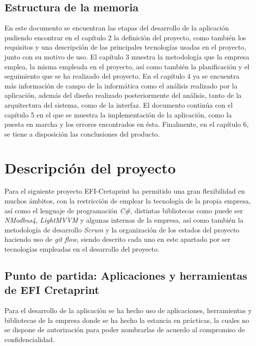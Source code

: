 \documentclass[pdftex,11pt,a4paper]{book}
\begin{document}
\section{Estructura de la memoria}

En este documento se encuentran las etapas del desarrollo de la aplicación pudiendo encontrar en el capítulo 2 la definición del proyecto, como también los requisitos y una descripción de las principales tecnologías usadas en el proyecto, junto con su motivo de uso. El capítulo 3 muestra la metodología que la empresa emplea, la misma empleada en el proyecto, así como también la planificación y el seguimiento que se ha realizado del proyecto. En el capítulo 4 ya se encuentra más información de campo de la informática como el análisis realizado por la aplicación, además del diseño realizado posteriormente del análisis, tanto de la arquitectura del sistema, como de la interfaz. El documento continúa con el capítulo 5 en el que se muestra la implementación de la aplicación, como la puesta en marcha y los errores encontrados en ésta. Finalmente, en el capítulo 6, se tiene a disposición las conclusiones del producto.

\chapter{Descripción del proyecto}


Para el siguiente proyecto EFI-Cretaprint ha permitido una gran flexibilidad en muchos ámbitos, con la restricción de emplear la tecnología de la propia empresa, así como el lenguaje de programación \textit{C\#}, distintas bibliotecas  como puede ser \textit{NModbus4}, \textit{LightMVVM} y algunas internas de la empresa, así como también la metodología de desarrollo \textit{Scrum} y la organización de los estados del proyecto haciendo uso de \textit{git flow}, siendo descrito cada uno en este apartado por ser tecnologías empleadas en el desarrollo del proyecto.

\section{Punto de partida: Aplicaciones y herramientas de EFI Cretaprint}


Para el desarrollo de la aplicación se ha hecho uso de aplicaciones, herramientas y bibliotecas de la empresa donde se ha hecho la estancia en prácticas, la cuales no se dispone de autorización para poder nombrarlas de acuerdo al compromiso de confidencialidad.
\end{document}
